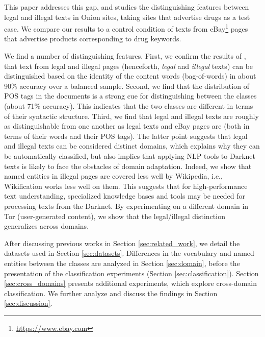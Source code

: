 \documentclass[11pt,a4paper,table]{article}
\newcommand{\es}[1]{\footnote{\color{purple}ES: #1}}
\begin{document}
  
  This paper addresses this gap, and studies the distinguishing features between legal and illegal texts in Onion sites,
  taking sites that advertise drugs as a test case. We compare our results to a control condition of texts 
  from eBay\footnote{\url{https://www.ebay.com}} pages that 
	advertise products corresponding to drug keywords.
 
  We find a number of distinguishing features. First, we confirm the results of \citet{Avarikioti18}, 
	that text from legal and illegal pages (henceforth, {\it legal} and {\it illegal} texts) can be distinguished based on the identity of the content words (bag-of-words) 
  in about 90\% accuracy over a balanced sample. Second, we find that the distribution of POS tags in the documents is a strong cue for 
	distinguishing between the classes (about 71\% accuracy). This indicates that the two classes are different in 
	terms of their syntactic structure. Third, we find that legal and illegal texts are roughly as distinguishable from one another as legal 
	texts and eBay pages are (both in terms of their words and their POS tags). 
	The latter point suggests that legal and illegal texts can be considered distinct domains, which explains why they can be 
	automatically classified, but also implies that applying NLP tools to Darknet texts is likely to face the obstacles of domain adaptation.  
  Indeed, we show that named entities in illegal pages are covered less well by Wikipedia, i.e., Wikification works less well on them.
  This suggests that for high-performance text understanding, specialized knowledge bases and tools may be needed for processing texts from the Darknet.
  By experimenting on a different domain in Tor (user-generated content), we show that the legal/illegal distinction generalizes across domains.

  After discussing previous works in Section \ref{sec:related_work}, we detail the datasets used in Section \ref{sec:datasets}. Differences in the vocabulary and named entities between the classes are analyzed in Section \ref{sec:domain}, before the presentation of the classification experiments (Section \ref{sec:classification}). Section \ref{sec:cross_domains} presents additional experiments, which explore cross-domain classification. We further analyze and discuss the findings in Section \ref{sec:discussion}.
  
\end{document}
